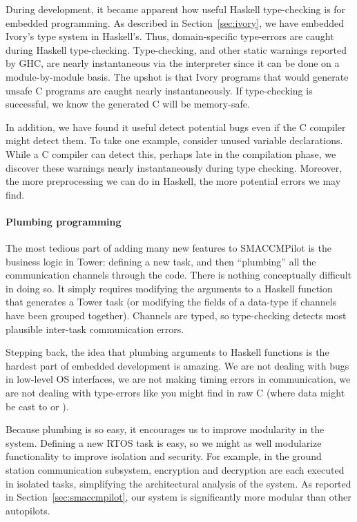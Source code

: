 During development, it became apparent how useful Haskell type-checking
is for embedded programming.  As described in Section~\ref{sec:ivory}, we
have embedded Ivory's type system in Haskell's.  Thus, domain-specific
type-errors are caught during Haskell type-checking.  Type-checking, and other
static warnings reported by GHC, are nearly instantaneous via the interpreter
since it can be done on a module-by-module basis.  The upshot is that Ivory
programs that would generate unsafe C programs are caught nearly
instantaneously.  If type-checking is successful, we know the generated C will
be memory-safe.

In addition, we have found it useful detect potential bugs even if the C
compiler might detect them.  To take one example, consider unused variable
declarations.  While a C compiler can detect this, perhaps late in the
compilation phase, we discover these warnings nearly instantaneously during type
checking.  Moreover, the more preprocessing we can do in Haskell, the more
potential errors we may find.

\paragraph{Plumbing programming}
The most tedious part of adding many new features to SMACCMPilot is the business
logic in Tower: defining a new task, and then ``plumbing'' all the communication
channels through the code.  There is nothing conceptually difficult in doing so.
It simply requires modifying the arguments to a Haskell function that generates
a Tower task (or modifying the fields of a data-type if channels have been
grouped together).  Channels are typed, so type-checking detects most plausible
inter-task communication errors.

Stepping back, the idea that plumbing arguments to Haskell functions is the
hardest part of embedded development is amazing.  We are not dealing with bugs
in low-level OS interfaces, we are not making timing errors in communication, we
are not dealing with type-errors like you might find in raw C (where data might
be cast to  or ).

Because plumbing is so easy, it encourages us to improve modularity in the
system.  Defining a new RTOS task is easy, so we might as well modularize
functionality to improve isolation and security.  For example, in the ground
station communication subsystem, encryption and decryption are each executed in
isolated tasks, simplifying the architectural analysis of the system.  As
reported in Section~\ref{sec:smaccmpilot}, our system is significantly more
modular than other autopilots.

